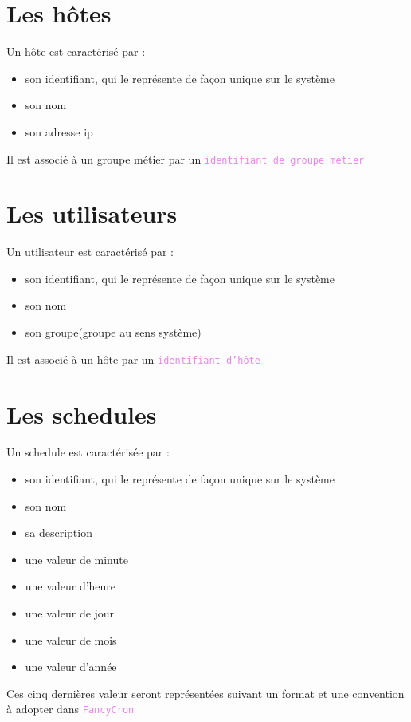 \documentclass{bouygues-fr}
\begin{document}
\section{Les hôtes}
Un hôte est caractérisé par :
\begin{itemize}
\item son identifiant, qui le représente de façon unique sur le système
\item son nom
\item son adresse ip
\end{itemize} 
 
Il est associé à un groupe métier par un \textcolor{violet}{\texttt{identifiant de groupe métier}}

\section{Les utilisateurs}
Un utilisateur est caractérisé par :
\begin{itemize}
\item son identifiant, qui le représente de façon unique sur le système
\item son nom
\item son groupe(groupe au sens système)
\end{itemize} 

Il est associé à un hôte par un \textcolor{violet}{\texttt{identifiant d'hôte}}

\section{Les schedules}
Un schedule est caractérisée par :
\begin{itemize}
\item son identifiant, qui le représente de façon unique sur le système
\item son nom
\item sa description
\item une valeur de minute
\item une valeur d'heure
\item une valeur de jour
\item une valeur de mois
\item une valeur d'année
\end{itemize} 

Ces cinq dernières valeur seront représentées suivant un format et une convention à adopter dans \textcolor{violet}{\texttt{FancyCron}}
\end{document}
